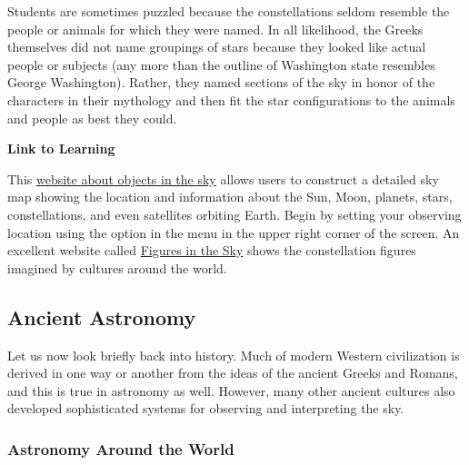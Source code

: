\documentclass[../../main-astronomy.tex]{subfiles}
\begin{document}
\vspace{1em}

Students are sometimes puzzled because the constellations seldom resemble the people or animals for which they were named. In all likelihood, the Greeks themselves did not name groupings of stars because they looked like actual people or subjects (any more than the outline of Washington state resembles George Washington). Rather, they named sections of the sky in honor of the characters in their mythology and then fit the star configurations to the animals and people as best they could.

\begin{mdframed}[backgroundcolor=black!10]
    \textbf{Link to Learning}
    
    \vspace{1ex}

    This \href{https://openstax.org/l/30heavensabove}{website about objects in the sky} allows users to construct a detailed sky map showing the location and information about the Sun, Moon, planets, stars, constellations, and even satellites orbiting Earth. Begin by setting your observing location using the option in the menu in the upper right corner of the screen. An excellent website called \href{https://openstax.org/l/30constel}{Figures in the Sky} shows the constellation figures imagined by cultures around the world.
\end{mdframed}

\subsection{Ancient Astronomy}

Let us now look briefly back into history. Much of modern Western civilization is derived in one way or another from the ideas of the ancient Greeks and Romans, and this is true in astronomy as well. However, many other ancient cultures also developed sophisticated systems for observing and interpreting the sky.

\subsubsection*{Astronomy Around the World}
\end{document}

